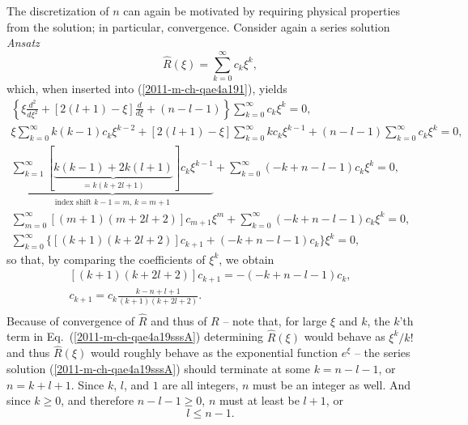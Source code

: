 The discretization of $n$ can again be motivated by requiring physical properties from
the solution; in particular, convergence.
Consider again a series solution {\it Ansatz}
\begin{equation}
\hat{R}(  \xi ) = \sum_{k=0}^\infty c_k\xi^k ,
\label{2011-m-ch-qae4a19sssA}
\end{equation}
which, when inserted into (\ref{2011-m-ch-qae4a191}),
yields
\begin{equation}
\begin{split}
\left\{
\xi  \frac{d^2}{   d    \xi^2}   + [ 2 (l+1)-\xi] \frac{   d   }{   d    \xi } + ( n-l-1  )
\right\}
\sum_{k=0}^\infty c_k\xi^k
=0,\\
%
\xi  \sum_{k=0}^\infty k(k-1) c_k\xi^{k-2}
+ [ 2 (l+1)-\xi] \sum_{k=0}^\infty k c_k\xi^{k-1}
+ ( n-l-1  )\sum_{k=0}^\infty c_k\xi^k
=0,\\
%
\underbrace{\sum_{k=1}^\infty \left[ \underbrace{k(k-1) + 2k(l+1)}_{=k(k+2l+1)}\right] c_k\xi^{k-1}}_{\text{index shift }k-1=m\text{, }k=m+1}
+
 \sum_{k=0}^\infty (-k + n-l-1  ) c_k\xi^k
=0,\\
%
\sum_{m=0}^\infty \left[ (m+1)(m+2l+2)\right] c_{m+1}\xi^m
+
 \sum_{k=0}^\infty (-k + n-l-1  ) c_k\xi^k
=0,\\
%
\sum_{k=0}^\infty
\Big\{
\left[ (k+1)(k+2l+2)\right] c_{k+1}
+
 (-k + n-l-1  ) c_k
\Big\}
\xi^k
=0,
\end{split}
\label{2011-m-ch-qae4a191ssA}
\end{equation}
so that, by comparing the coefficients of $\xi^k$, we obtain
\begin{equation}
\begin{split}
\left[ (k+1)(k+2l+2)\right] c_{k+1}
= -
 (-k + n-l-1  ) c_k  ,\\
c_{k+1}
=
c_k   \frac{k - n + l+ 1   }{(k+1) (k  + 2l + 2 )}  .\\
\end{split}
\label{2011-m-ch-qae4a191ssA5}
\end{equation}
Because of convergence of $\hat{R}$ and thus of $R$
--
note that, for large $\xi$ and $k$, the $k$'th term in
Eq.~(\ref{2011-m-ch-qae4a19sssA}) determining $\hat{R}(  \xi )$
would behave as $\xi^k/k!$
and thus  $\hat{R}(  \xi )$ would roughly behave as the exponential function $e^\xi$
--
the series solution
(\ref{2011-m-ch-qae4a19sssA})
should terminate at some   $k =   n-l-1$,
or  $ n=  k+l+1$. Since $k$, $l$, and $1$ are all integers,
$n$ must be an integer as well.
And since $k\ge 0$,
and therefore $n-l-1 \ge 0$,
$n$ must at least be $l+1$, or
\begin{equation}
l\le n-1 .
\label{2011-m-ch-qae4a191ssA5hqz}
\end{equation}


